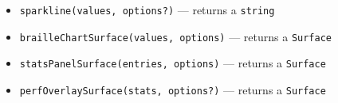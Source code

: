 \begin{itemize}
\tightlist
\item
  \texttt{s\allowbreak{}p\allowbreak{}a\allowbreak{}r\allowbreak{}k\allowbreak{}l\allowbreak{}i\allowbreak{}n\allowbreak{}e\allowbreak{}(\allowbreak{}v\allowbreak{}a\allowbreak{}l\allowbreak{}u\allowbreak{}e\allowbreak{}s\allowbreak{},\allowbreak{} \allowbreak{}o\allowbreak{}p\allowbreak{}t\allowbreak{}i\allowbreak{}o\allowbreak{}n\allowbreak{}s\allowbreak{}?\allowbreak{})} --- returns a \texttt{s\allowbreak{}t\allowbreak{}r\allowbreak{}i\allowbreak{}n\allowbreak{}g}
\item
  \texttt{b\allowbreak{}r\allowbreak{}a\allowbreak{}i\allowbreak{}l\allowbreak{}l\allowbreak{}e\allowbreak{}C\allowbreak{}h\allowbreak{}a\allowbreak{}r\allowbreak{}t\allowbreak{}S\allowbreak{}u\allowbreak{}r\allowbreak{}f\allowbreak{}a\allowbreak{}c\allowbreak{}e\allowbreak{}(\allowbreak{}v\allowbreak{}a\allowbreak{}l\allowbreak{}u\allowbreak{}e\allowbreak{}s\allowbreak{},\allowbreak{} \allowbreak{}o\allowbreak{}p\allowbreak{}t\allowbreak{}i\allowbreak{}o\allowbreak{}n\allowbreak{}s\allowbreak{})} --- returns a \texttt{S\allowbreak{}u\allowbreak{}r\allowbreak{}f\allowbreak{}a\allowbreak{}c\allowbreak{}e}
\item
  \texttt{s\allowbreak{}t\allowbreak{}a\allowbreak{}t\allowbreak{}s\allowbreak{}P\allowbreak{}a\allowbreak{}n\allowbreak{}e\allowbreak{}l\allowbreak{}S\allowbreak{}u\allowbreak{}r\allowbreak{}f\allowbreak{}a\allowbreak{}c\allowbreak{}e\allowbreak{}(\allowbreak{}e\allowbreak{}n\allowbreak{}t\allowbreak{}r\allowbreak{}i\allowbreak{}e\allowbreak{}s\allowbreak{},\allowbreak{} \allowbreak{}o\allowbreak{}p\allowbreak{}t\allowbreak{}i\allowbreak{}o\allowbreak{}n\allowbreak{}s\allowbreak{})} --- returns a \texttt{S\allowbreak{}u\allowbreak{}r\allowbreak{}f\allowbreak{}a\allowbreak{}c\allowbreak{}e}
\item
  \texttt{p\allowbreak{}e\allowbreak{}r\allowbreak{}f\allowbreak{}O\allowbreak{}v\allowbreak{}e\allowbreak{}r\allowbreak{}l\allowbreak{}a\allowbreak{}y\allowbreak{}S\allowbreak{}u\allowbreak{}r\allowbreak{}f\allowbreak{}a\allowbreak{}c\allowbreak{}e\allowbreak{}(\allowbreak{}s\allowbreak{}t\allowbreak{}a\allowbreak{}t\allowbreak{}s\allowbreak{},\allowbreak{} \allowbreak{}o\allowbreak{}p\allowbreak{}t\allowbreak{}i\allowbreak{}o\allowbreak{}n\allowbreak{}s\allowbreak{}?\allowbreak{})} --- returns a \texttt{S\allowbreak{}u\allowbreak{}r\allowbreak{}f\allowbreak{}a\allowbreak{}c\allowbreak{}e}
\end{itemize}

